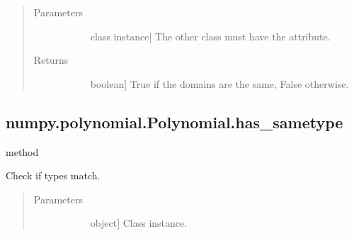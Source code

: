 \documentclass[letterpaper,10pt,english]{sphinxmanual}
\begin{document}
\begin{fulllineitems}
\begin{fulllineitems}
\begin{quote}\begin{description}
\item[{Parameters}] \leavevmode\begin{description}
\item[{}] \leavevmode{[}class instance{]}
The other class must have the  attribute.

\end{description}

\item[{Returns}] \leavevmode\begin{description}
\item[{}] \leavevmode{[}boolean{]}
True if the domains are the same, False otherwise.

\end{description}

\end{description}\end{quote}

\end{fulllineitems}



\subsection{numpy.polynomial.Polynomial.has\_sametype}
\label{\detokenize{generated/generated/numpy.polynomial.Polynomial.has_sametype:numpy-polynomial-polynomial-has-sametype}}\label{\detokenize{generated/generated/numpy.polynomial.Polynomial.has_sametype::doc}}
method

\begin{fulllineitems}
\label{\detokenize{generated/generated/numpy.polynomial.Polynomial.has_sametype:numpy.polynomial.Polynomial.has_sametype}}
Check if types match.

\begin{quote}\begin{description}
\item[{Parameters}] \leavevmode\begin{description}
\item[{}] \leavevmode{[}object{]}
Class instance.


\end{description}
\end{description}
\end{quote}
\end{fulllineitems}
\end{fulllineitems}
\end{document}
